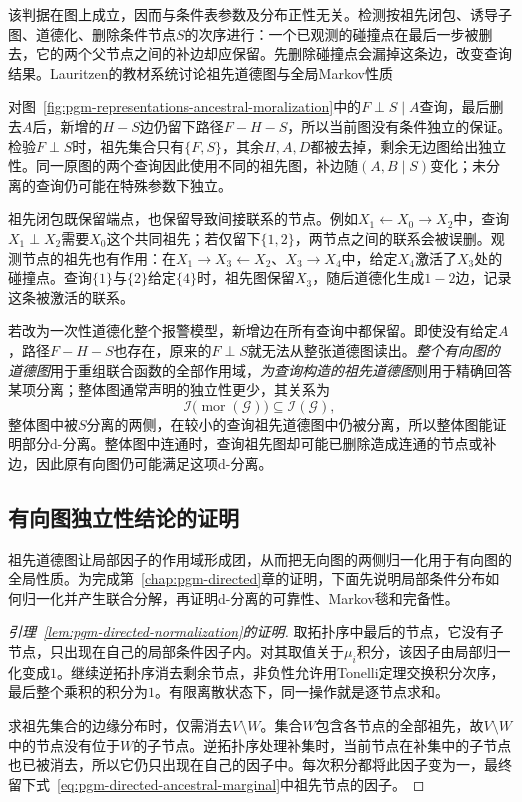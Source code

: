 该判据在图上成立，因而与条件表参数及分布正性无关。检测按祖先闭包、诱导子图、道德化、删除条件节点$S$的次序进行：一个已观测的碰撞点在最后一步被删去，它的两个父节点之间的补边却应保留。先删除碰撞点会漏掉这条边，改变查询结果。Lauritzen的教材系统讨论祖先道德图与全局Markov性质

对图~\ref{fig:pgm-representations-ancestral-moralization}中的$F\perp S\mid A$查询，最后删去$A$后，新增的$H-S$边仍留下路径$F-H-S$，所以当前图没有条件独立的保证。检验$F\perp S$时，祖先集合只有$\{F,S\}$，其余$H,A,D$都被去掉，剩余无边图给出独立性。同一原图的两个查询因此使用不同的祖先图，补边随$(A,B\mid S)$变化；未分离的查询仍可能在特殊参数下独立。

祖先闭包既保留端点，也保留导致间接联系的节点。例如$X_1\leftarrow X_0\to X_2$中，查询$X_1\perp X_2$需要$X_0$这个共同祖先；若仅留下$\{1,2\}$，两节点之间的联系会被误删。观测节点的祖先也有作用：在$X_1\to X_3\leftarrow X_2$、$X_3\to X_4$中，给定$X_4$激活了$X_3$处的碰撞点。查询$\{1\}$与$\{2\}$给定$\{4\}$时，祖先图保留$X_3$，随后道德化生成$1-2$边，记录这条被激活的联系。

若改为一次性道德化整个报警模型，新增边在所有查询中都保留。即使没有给定$A$，路径$F-H-S$也存在，原来的$F\perp S$就无法从整张道德图读出。\emph{整个有向图的道德图}用于重组联合函数的全部作用域，\emph{为查询构造的祖先道德图}则用于精确回答某项分离；整体图通常声明的独立性更少，其关系为
\begin{equation}
  \mathcal{I}\bigl(\operatorname{mor}(\mathcal{G})\bigr)
  \subseteq \mathcal{I}(\mathcal{G}),
  \label{eq:pgm-representations-moral-inclusion}
\end{equation}
整体图中被$S$分离的两侧，在较小的查询祖先道德图中仍被分离，所以整体图能证明部分d-分离。整体图中连通时，查询祖先图却可能已删除造成连通的节点或补边，因此原有向图仍可能满足这项d-分离。

\subsection{有向图独立性结论的证明}
\label{sec:pgm-representations-directed-proofs}

祖先道德图让局部因子的作用域形成团，从而把无向图的两侧归一化用于有向图的全局性质。为完成第~\ref{chap:pgm-directed}章的证明，下面先说明局部条件分布如何归一化并产生联合分解，再证明d-分离的可靠性、Markov毯和完备性。

\begin{proof}[引理~\ref{lem:pgm-directed-normalization}的证明]
取拓扑序中最后的节点，它没有子节点，只出现在自己的局部条件因子内。对其取值关于$\mu_i$积分，该因子由局部归一化变成$1$。继续逆拓扑序消去剩余节点，非负性允许用Tonelli定理交换积分次序，最后整个乘积的积分为$1$。有限离散状态下，同一操作就是逐节点求和。

求祖先集合的边缘分布时，仅需消去$V\setminus W$。集合$W$包含各节点的全部祖先，故$V\setminus W$中的节点没有位于$W$的子节点。逆拓扑序处理补集时，当前节点在补集中的子节点也已被消去，所以它仍只出现在自己的因子中。每次积分都将此因子变为一，最终留下式~\eqref{eq:pgm-directed-ancestral-marginal}中祖先节点的因子。
\end{proof}

